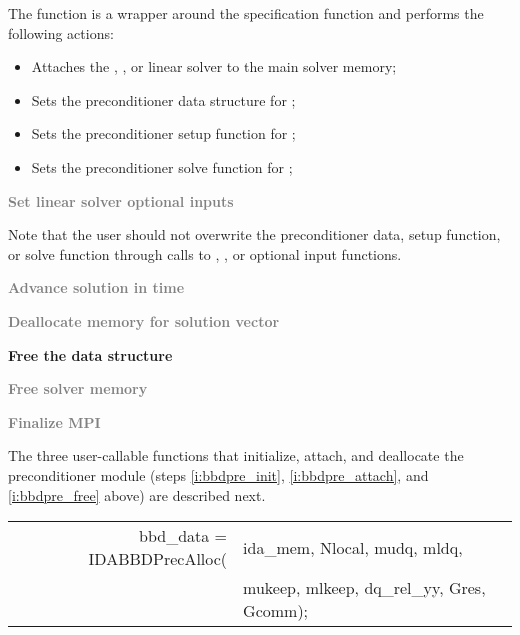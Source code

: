 \begin{Steps}
  The function  is a wrapper around the specification
  function  and performs the following actions:
  \begin{itemize}
    \item Attaches the {\idaspgmr}, {\idaspbcg}, or {\idasptfqmr} linear solver to the main {\ida} solver memory;
    \item Sets the preconditioner data structure for {\idabbdpre};
    \item Sets the preconditioner setup function for {\idabbdpre};
    \item Sets the preconditioner solve function for {\idabbdpre};
  \end{itemize}

\item
  \textcolor{gray}{\bf Set linear solver optional inputs}

  Note that the user should not overwrite the preconditioner data, setup function, 
  or solve function through calls to {\idaspgmr}, {\idaspbcg}, or {\idasptfqmr} optional
  input functions.

\item
  \textcolor{gray}{\bf Advance solution in time}

\item
  \textcolor{gray}{\bf Deallocate memory for solution vector}

\item \label{i:bbdpre_free}
  {\bf Free the {\idabbdpre} data structure}


\item
  \textcolor{gray}{\bf Free solver memory}
  
\item 
  \textcolor{gray}{\bf Finalize MPI}

\end{Steps}
The three user-callable functions that initialize, attach, and deallocate
the {\idabbdpre} preconditioner module (steps \ref{i:bbdpre_init},
\ref{i:bbdpre_attach}, and \ref{i:bbdpre_free} above) are described
next.
{
   \begin{tabular}[t]{@{}r@{}l@{}}
     bbd\_data = IDABBDPrecAlloc(&ida\_mem, Nlocal, mudq, mldq, \\
                                 &mukeep, mlkeep, dq\_rel\_yy, Gres, Gcomm);
   \end{tabular}
}
